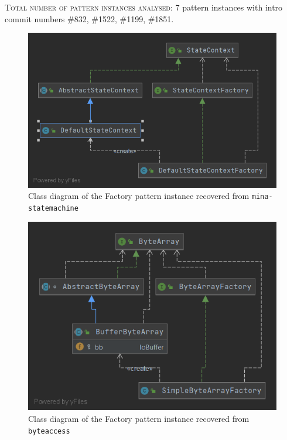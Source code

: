 \textsc{Total number of pattern instances analysed:} 7 pattern instances with intro commit numbers \#832, \#1522, \#1199, \#1851.

\begin{figure}[H]
    \centering
    \includegraphics[width = 0.7 \textwidth]{images/class_diagrams/factory1.png}
    \caption{Class diagram of the Factory pattern instance recovered from \texttt{mina-statemachine}}
    \label{fig:factory1}
\end{figure}

\begin{figure}[H]
    \centering
    \includegraphics[width = 0.6 \textwidth]{images/class_diagrams/factory2.png}
    \caption{Class diagram of the Factory pattern instance recovered from \texttt{byteaccess}}
    \label{fig:factory2}
\end{figure}

